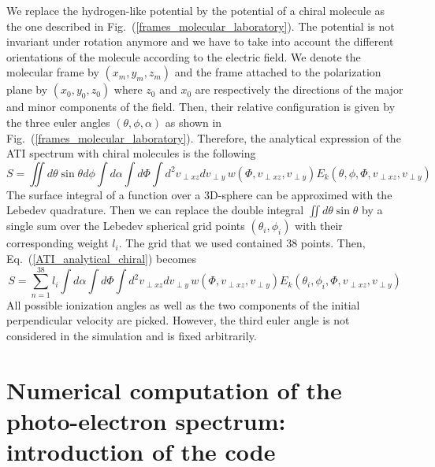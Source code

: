 \documentclass[a4paper]{article}
\begin{document}
We replace the hydrogen-like potential by the potential of a chiral molecule as the one described in Fig.~(\ref{frames_molecular_laboratory}). The potential is not invariant under rotation anymore and we have to take into account the different orientations of the molecule according to the electric field. We denote the molecular frame by $(x_{m}, y_{m}, z_{m})$ and the frame attached to the polarization plane by $(x_{0}, y_{0}, z_{0})$ where $z_{0}$ and $x_{0}$ are respectively the directions of the major and minor components of the field. Then, their relative configuration is given by the three euler angles $(\theta, \phi, \alpha)$ as shown in Fig.~(\ref{frames_molecular_laboratory}). 
Therefore, the analytical expression of the ATI spectrum with chiral molecules is the following 
\begin{equation}
\label{ATI_analytical_chiral}
S=\iint d\theta \sin{\theta} d\phi \int d\alpha \int d\Phi \int d^{2}v_{\perp xz}dv_{\perp y} \, w(\Phi, v_{\perp xz}, v_{\perp y}) E_{k}(\theta, \phi, \Phi, v_{\perp xz}, v_{\perp y})
\end{equation}
The surface integral of a function over a 3D-sphere can be approximed with the Lebedev quadrature. Then we can replace the double integral $\iint d\theta \sin{\theta}$ by a single sum over the Lebedev spherical grid points $(\theta_{i}, \phi_{i})$ with their corresponding weight $l_{i}$. The grid that we used contained 38 points.
Then, Eq.~(\ref{ATI_analytical_chiral}) becomes
\begin{equation}
\label{ATI_analytical_2}
S=\sum_{n=1}^{38} l_{i} \int d\alpha \int d\Phi \int d^{2}v_{\perp xz}dv_{\perp y} \, w(\Phi, v_{\perp xz}, v_{\perp y}) E_{k}(\theta_{i}, \phi_{i}, \Phi, v_{\perp xz}, v_{\perp y})
\end{equation}
All possible ionization angles as well as the two components of the initial perpendicular velocity are picked. However, the third euler angle is not considered in the simulation and is fixed arbitrarily.



\newpage
\appendix

\section{Numerical computation of the photo-electron spectrum: introduction of the code}
\label{code}
\end{document}
